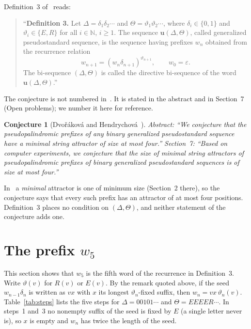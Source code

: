 \documentclass[11pt]{article}
\newtheorem{conjecture}[theorem]{Conjecture}
\theoremstyle{remark}
\begin{document}
\noindent Definition~3 of~\cite{dh} reads:
\begin{quote}
``\textbf{Definition 3.} Let $\Delta=\delta_1\delta_2\cdots$ and $\Theta=\vartheta_1\vartheta_2\cdots$,
where $\delta_i\in\{0,1\}$ and $\vartheta_i\in\{E,R\}$ for all
$i\in\mathbb N$, $i\geq1$. The sequence $\mathbf u(\Delta,\Theta)$, called
generalized pseudostandard sequence, is the sequence having prefixes $w_n$
obtained from the recurrence relation
\[
w_{n+1}=(w_n\delta_{n+1})^{\vartheta_{n+1}},\qquad w_0=\varepsilon.
\]
The bi-sequence $(\Delta,\Theta)$ is called the directive bi-sequence of the
word $\mathbf u(\Delta,\Theta)$.''
\end{quote}

The conjecture is not numbered in~\cite{dh}. It is stated in the abstract and
in Section~7 (Open problems); we number it here for reference.

\begin{conjecture}[Dvořáková and Hendrychová~\cite{dh}]\label{conj}
Abstract: ``We conjecture that the pseudopalindromic prefixes of any binary
generalized pseudostandard sequence have a minimal string attractor of size
at most four.'' Section~7: ``Based on computer experiments, we conjecture
that the size of minimal string attractors of pseudopalindromic prefixes of
binary generalized pseudostandard sequences is of size at most four.''
\end{conjecture}

\noindent In~\cite{dh} a \emph{minimal} attractor is one of minimum size
(Section~2 there), so the conjecture says that every such prefix has an
attractor of at most four positions. Definition~3 places no condition on
$(\Delta,\Theta)$, and neither statement of the conjecture adds one.

\section{The prefix \texorpdfstring{$w_5$}{w5}}\label{sec:member}

This section shows that $w_5$ is the fifth word of the recurrence in
Definition~3. Write $\vartheta(v)$ for $R(v)$ or $E(v)$. By the remark quoted
above, if the seed $w_{n-1}\delta_n$ is written as $vx$ with $x$ its longest
$\vartheta_n$-fixed suffix, then $w_n=vx\,\vartheta_n(v)$. Table~\ref{tab:steps}
lists the five steps for $\Delta=00101\cdots$ and $\Theta=EEEER\cdots$. In
steps~1 and~3 no nonempty suffix of the seed is fixed by $E$ (a single letter
never is), so $x$ is empty and $w_n$ has twice the length of the seed.
\end{document}
